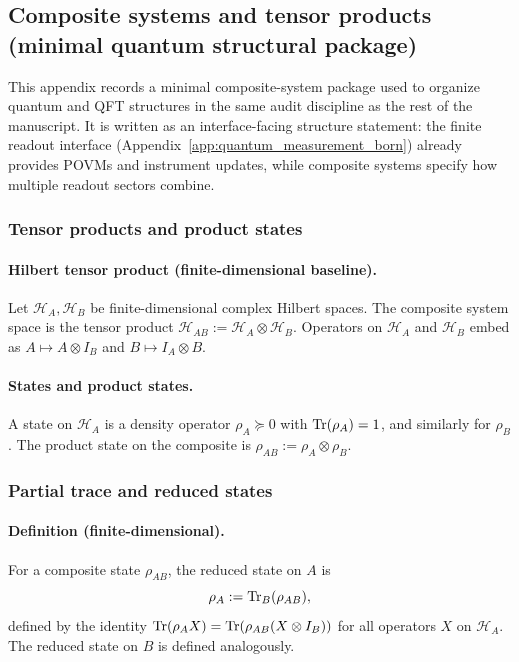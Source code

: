 \subsection{Composite systems and tensor products (minimal quantum structural package)}
\label{app:composite_systems_tensor_products}

This appendix records a minimal composite-system package used to organize quantum and QFT structures in the same audit discipline as the rest of the manuscript.
It is written as an interface-facing structure statement: the finite readout interface (Appendix~\ref{app:quantum_measurement_born}) already provides POVMs and instrument updates, while composite systems specify how multiple readout sectors combine.

\subsubsection{Tensor products and product states}
\paragraph{Hilbert tensor product (finite-dimensional baseline).}
Let $\mathcal{H}_A,\mathcal{H}_B$ be finite-dimensional complex Hilbert spaces.
The composite system space is the tensor product $\mathcal{H}_{AB}:=\mathcal{H}_A\otimes \mathcal{H}_B$.
Operators on $\mathcal{H}_A$ and $\mathcal{H}_B$ embed as $A\mapsto A\otimes I_B$ and $B\mapsto I_A\otimes B$.

\paragraph{States and product states.}
A state on $\mathcal{H}_A$ is a density operator $\rho_A\succeq 0$ with $\mathrm{Tr}(\rho_A)=1$, and similarly for $\rho_B$.
The product state on the composite is $\rho_{AB}:=\rho_A\otimes \rho_B$.

\subsubsection{Partial trace and reduced states}
\paragraph{Definition (finite-dimensional).}
For a composite state $\rho_{AB}$, the reduced state on $A$ is
\[
\rho_A:=\mathrm{Tr}_B(\rho_{AB}),
\]
defined by the identity $\mathrm{Tr}(\rho_A X)=\mathrm{Tr}(\rho_{AB}(X\otimes I_B))$ for all operators $X$ on $\mathcal{H}_A$.
The reduced state on $B$ is defined analogously.

